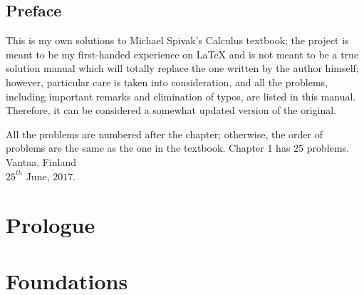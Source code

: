 \documentclass[a4paper,11pt]{memoir}
\newcommand{\note}[1]{\emph{#1}}
\theoremstyle{plain} \newtheorem{id}{Lemma}[chapter]
\theoremstyle{definition} \newtheorem{pr}{Problem}[chapter]
\theoremstyle{remark}\newtheorem{ab}{Remark}[chapter]
\begin{document}
  \chapter{Preface}
    This is my own solutions to Michael Spivak's Calculus
    textbook; the project is meant to be my first-handed experience on
    \LaTeX{} and is not meant to be a true solution manual which will
    totally replace the one written by the author himself; however, particular
    care is taken into consideration, and all the problems, including important
    remarks and elimination of typos, are listed in this manual. Therefore, it can
    be considered a somewhat updated version of the original.
    \par
    All the problems are numbered after the chapter;
    otherwise, the order of problems are the same as
    the one in the textbook.
    Chapter $1$ has $25$ problems.
    \flushright
    Vantaa, Finland \\
    $25^{th}$ June, $2017$.
  \clearpage
  \tableofcontents

\mainmatter
  \renewcommand{\partnote}{
  This page is intentionally left blank.
  }
  \part{Prologue}
    
    
  \renewcommand{\doublenote}{%
  \note{It takes until January $13^{th}, 2018$ to reach this part.}}
  \part{Foundations}
    
\end{document}
